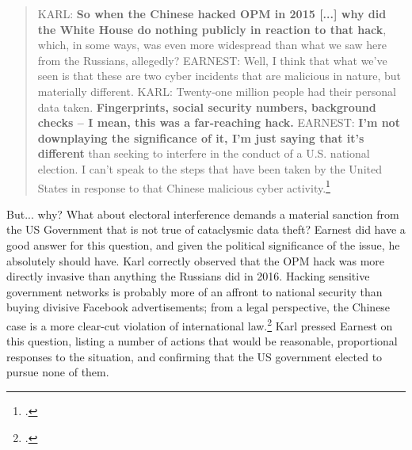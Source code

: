 \documentclass[11pt]{memoir}
\begin{document}
\begin{refsegment}
\begin{quote}
KARL: \textbf{So when the Chinese hacked OPM in 2015 [...] why did the White House do nothing publicly in reaction to that hack}, which, in some ways, was even more widespread than what we saw here from the Russians, allegedly?
\newline \newline
EARNEST: Well, I think that what we've seen is that these are two cyber incidents that are malicious in nature, but materially different.
\newline \newline
KARL: Twenty-one million people had their personal data taken.  \textbf{Fingerprints, social security numbers, background checks -- I mean, this was a far-reaching hack.}
\newline \newline
EARNEST: \textbf{I'm not downplaying the significance of it, I'm just saying that it's different} than seeking to interfere in the conduct of a U.S. national election. I can't speak to the steps that have been taken by the United States in response to that Chinese malicious cyber activity.\footcite[Transcript adapted from the official White House website.]{earnest_press_2017}
\end{quote}
But... why? What about electoral interference demands a material sanction from the US Government that is not true of cataclysmic data theft? Earnest did have a good answer for this question, and given the political significance of the issue, he absolutely should have. Karl correctly observed that the OPM hack was more directly invasive than anything the Russians did in 2016. Hacking sensitive government networks is probably more of an affront to national security than buying divisive Facebook advertisements; from a legal perspective, the Chinese case is a more clear-cut violation of international law.\footcite[p.~625]{terry_dont_2018} Karl pressed Earnest on this question, listing a number of actions that would be reasonable, proportional responses to the situation, and confirming that the US government elected to pursue none of them.


\end{refsegment}
\end{document}
